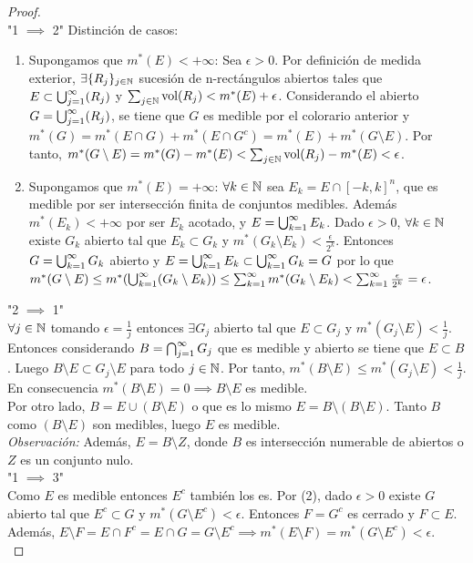 \begin{proof}
    \leavevmode\\
    "1 $\implies$ 2"
    Distinción de casos: 
    \begin{enumerate}
        \item Supongamos que $m^*(E) < +\infty$: Sea $\epsilon > 0$. Por definición de medida exterior, $\exists \{R_j\}_{j \in \mathbb{N}}$ sucesión de n-rectángulos abiertos tales que $E \subset \bigcup_{j=1}^{\infty}(R_j)$ y $\sum_{j \in \mathbb{N}} \text{vol}(R_j) < m^*(E) + \epsilon$. Considerando el abierto $G = \bigcup_{j=1}^{\infty}(R_j)$, se tiene que $G$ es medible por el colorario anterior y $m^*(G) = m^*(E \cap G) + m^*(E \cap G^c) = m^*(E) + m^*(G \setminus E)$. Por tanto, $m^*(G \setminus E) = m^*(G) - m^*(E) < \sum_{j \in \mathbb{N}} \text{vol}(R_j) - m^*(E) < \epsilon$.
        \item Supongamos que $m^*(E) = +\infty$: $\forall k \in \mathbb{N}$ sea $E_k = E \cap [-k,k]^n$, que es medible por ser intersección finita de conjuntos medibles. Además $m^*(E_k) < +\infty$ por ser $E_k$ acotado, y $E = \bigcup_{k=1}^{\infty}{E_k}$. Dado $\epsilon > 0$, $\forall k \in \mathbb{N}$ existe $G_k$ abierto tal que $E_k \subset G_k$ y $m^*(G_k \setminus E_k) < \frac{\epsilon}{2^k}$. Entonces $G = \bigcup_{k=1}^{\infty}{G_k}$ abierto y $E = \bigcup_{k=1}^{\infty}{E_k} \subset \bigcup_{k=1}^{\infty}{G_k} = G$ por lo que $m^*(G \setminus E) \leq m^*(\bigcup_{k=1}^{\infty}(G_k \setminus E_k)) \leq \sum_{k=1}^{\infty}{m^*(G_k \setminus E_k)} < \sum_{k=1}^{\infty}{\frac{\epsilon}{2^k}} = \epsilon$.
    \end{enumerate}
    "2 $\implies$ 1"\\
    $\forall j \in \mathbb{N}$ tomando $\epsilon = \frac{1}{j}$ entonces $\exists G_j$ abierto tal que $E \subset G_j$ y $m^*(G_j \setminus E) < \frac{1}{j}$. Entonces considerando $B = \bigcap_{j=1}^{\infty}{G_j}$ que es medible y abierto se tiene que $E \subset B$. Luego $B \setminus E \subset G_j \setminus E$ para todo $j \in \mathbb{N}$. Por tanto, $m^*(B \setminus E) \leq m^*(G_j \setminus E) < \frac{1}{j}$. En consecuencia $m^*(B \setminus E) = 0 \implies B \setminus E$ es medible.\\
    Por otro lado, $B = E \cup (B \setminus E)$ o que es lo mismo $E = B \setminus (B \setminus E)$. Tanto $B$ como $(B \setminus E)$ son medibles, luego $E$ es medible.\\
    \textit{Observación:} Además, $E = B \setminus Z$, donde $B$ es intersección numerable de abiertos o $Z$ es un conjunto nulo.\\
    "1 $\implies$ 3"\\
    Como $E$ es medible entonces $E^c$ también los es. Por (2), dado $\epsilon > 0$ existe $G$ abierto tal que $E^c \subset G$ y $m^*(G \setminus E^c) < \epsilon$. Entonces $F = G^c$ es cerrado y $F \subset E$. Además, $E \setminus F = E \cap F^c = E \cap G = G \setminus E^c \implies m^*(E \setminus F) = m^*(G \setminus E^c) < \epsilon$.\\

\end{proof}
